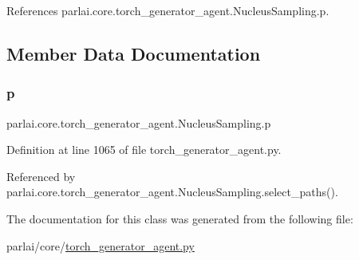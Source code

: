 References parlai.\+core.\+torch\+\_\+generator\+\_\+agent.\+Nucleus\+Sampling.\+p.



\subsection{Member Data Documentation}
\mbox{\label{classparlai_1_1core_1_1torch__generator__agent_1_1NucleusSampling_a54a43b58e2e2cf7da776c40311e0a3c1}} 
\subsubsection{\texorpdfstring{p}{p}}
{\footnotesize\ttfamily parlai.\+core.\+torch\+\_\+generator\+\_\+agent.\+Nucleus\+Sampling.\+p}



Definition at line 1065 of file torch\+\_\+generator\+\_\+agent.\+py.



Referenced by parlai.\+core.\+torch\+\_\+generator\+\_\+agent.\+Nucleus\+Sampling.\+select\+\_\+paths().



The documentation for this class was generated from the following file\+:\begin{DoxyCompactItemize}
\item 
parlai/core/\hyperlink{torch__generator__agent_8py}{torch\+\_\+generator\+\_\+agent.\+py}\end{DoxyCompactItemize}
